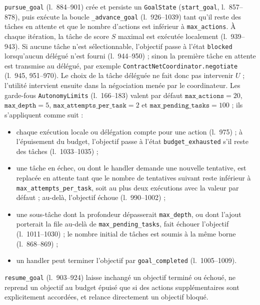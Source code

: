 \texttt{pursue\_goal} (l.~884--901) crée et persiste un \texttt{GoalState}
(\texttt{start\_goal}, l.~857--878), puis exécute la boucle
\texttt{\_advance\_goal} (l.~926--1039) tant qu'il reste des tâches en attente
et que le nombre d'actions est inférieur à \texttt{max\_actions}. À chaque
itération, la tâche de score $S$ maximal est exécutée localement
(l.~939--943). Si aucune tâche n'est sélectionnable, l'objectif passe à l'état
\texttt{blocked} lorsqu'aucun délégué n'est fourni (l.~944--950) ; sinon la
première tâche en attente est transmise au délégué, par exemple
\texttt{ContractNetCoordinator.negotiate} (l.~945, 951--970). Le choix de la
tâche déléguée ne fait donc pas intervenir $U$ ; l'utilité intervient ensuite
dans la négociation menée par le coordinateur. Les garde-fous
\texttt{AutonomyLimits} (l.~166--183) valent par défaut
$\texttt{max\_actions} = 20$, $\texttt{max\_depth} = 5$,
$\texttt{max\_attempts\_per\_task} = 2$ et
$\texttt{max\_pending\_tasks} = 100$ ; ils s'appliquent comme suit :
\begin{itemize}
  \item chaque exécution locale ou délégation compte pour une action
  (l.~975) ; à l'épuisement du budget, l'objectif passe à l'état
  \texttt{budget\_exhausted} s'il reste des tâches (l.~1033--1035) ;
  \item une tâche en échec, ou dont le handler demande une nouvelle tentative,
  est replacée en attente tant que le nombre de tentatives suivant reste
  inférieur à \texttt{max\_attempts\_per\_task}, soit au plus deux exécutions
  avec la valeur par défaut ; au-delà, l'objectif échoue (l.~990--1002) ;
  \item une sous-tâche dont la profondeur dépasserait \texttt{max\_depth}, ou
  dont l'ajout porterait la file au-delà de \texttt{max\_pending\_tasks},
  fait échouer l'objectif (l.~1011--1030) ; le nombre initial de tâches est
  soumis à la même borne (l.~868--869) ;
  \item un handler peut terminer l'objectif par \texttt{goal\_completed}
  (l.~1005--1009).
\end{itemize}
\texttt{resume\_goal} (l.~903--924) laisse inchangé un objectif terminé ou
échoué, ne reprend un objectif au budget épuisé que si des actions
supplémentaires sont explicitement accordées, et relance directement un
objectif bloqué.
